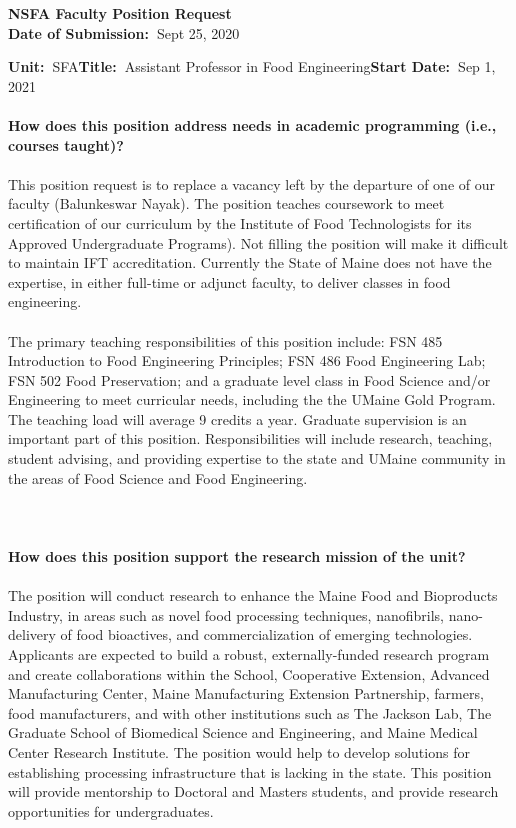 \documentclass[11pt]{article}
\begin{document}
\sloppy \rmfamily
\begin{center}\textbf{NSFA Faculty Position Request\\Date of Submission:~}Sept 25, 2020\end{center}

\noindent\textbf{Unit:~}SFA\hfill\textbf{Title:~}Assistant Professor in Food Engineering\hfill \textbf{Start Date:~}Sep 1, 2021\\~\\
\textbf{How does this position address needs in academic programming (i.e., courses taught)?}\\~\\
\small\sffamily 
This position request is to replace a vacancy left by the departure of one of our faculty (Balunkeswar Nayak). The position teaches coursework to meet certification of our curriculum by the Institute of Food Technologists for its Approved Undergraduate Programs). Not filling the position will make it difficult to maintain IFT accreditation. Currently the State of Maine does not have the expertise, in either full-time or adjunct faculty, to deliver classes in food engineering.
\\~\\
The primary teaching responsibilities of this position include: FSN 485 Introduction to Food Engineering Principles; FSN 486 Food Engineering Lab; FSN 502 Food Preservation; and a graduate level class in Food Science and/or Engineering to meet curricular needs, including the the UMaine Gold Program. The teaching load will average 9 credits a year. Graduate supervision is an important part of this position. Responsibilities will include research, teaching, student advising, and providing expertise to the state and UMaine community in the areas of Food Science and Food Engineering.  
\\~\\
\\~\\
\textbf{\rmfamily How does this position support the research mission of the unit?}\\~\\
The position will conduct research to enhance the Maine Food and Bioproducts Industry, in areas such as novel food processing techniques, nanofibrils, nano-delivery of food bioactives, and commercialization of emerging technologies.  Applicants are expected to build a robust, externally-funded research program and create collaborations within the School, Cooperative Extension, Advanced Manufacturing Center, Maine Manufacturing Extension Partnership, farmers, food manufacturers, and with other institutions such as The Jackson Lab, The Graduate School of Biomedical Science and Engineering, and Maine Medical Center Research Institute. The position would help to develop solutions for establishing processing infrastructure that is lacking in the state. This position will provide mentorship to Doctoral and Masters students, and provide research opportunities for undergraduates.
\end{document}

